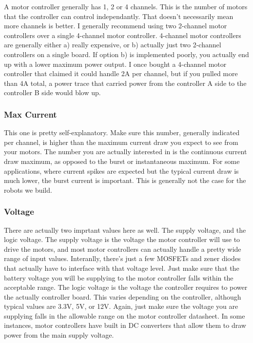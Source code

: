 A motor controller generally has 1, 2 or 4 channels. This is the number of motors that the controller can control independantly. That doesn't necessarily mean more channels is better. I generally recommend using two 2-channel motor controllers over a single 4-channel motor controller. 4-channel motor controllers are generally either a) really expensive, or b) actually just two 2-channel controllers on a single board. If option b) is implemented poorly, you actually end up with a lower maximum power output. I once bought a 4-channel motor controller that claimed it could handle 2A per channel, but if you pulled more than 4A total, a power trace that carried power from the controller A side to the controller B side would blow up.

\subsubsection{Max Current}

This one is pretty self-explanatory. Make sure this number, generally indicated per channel, is higher than the maximum current draw you expect to see from your motors. The number you are actually interested in is the continuous current draw maximum, as opposed to the burst or instantaneous maximum. For some applications, where current spikes are expected but the typical current draw is much lower, the burst current is important. This is generally not the case for the robots we build.

\subsubsection{Voltage}

There are actually two imprtant values here as well. The supply voltage, and the logic voltage. The supply voltage is the voltage the motor controller will use to drive the motors, and most motor controllers can actually handle a pretty wide range of input values. Interanlly, there's just a few MOSFETs and zener diodes that actually have to interface with that voltage level. Just make sure that the battery voltage you will be supplying to the motor controller falls within the acceptable range. The logic voltage is the voltage the controller requires to power the actually controller board. This varies depending on the controller, although typical values are 3.3V, 5V, or 12V. Again, just make sure the voltage you are supplying falls in the allowable range on the motor controller datasheet. In some instances, motor controllers have built in DC converters that allow them to draw power from the main supply voltage.

